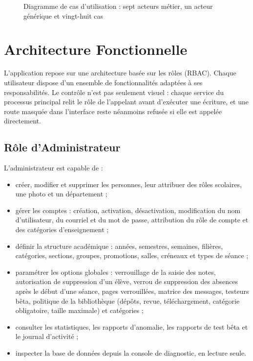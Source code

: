 \begin{figure}[H]
    \centering
    \resizebox{\textwidth}{!}{}
    \caption{Diagramme de cas d'utilisation : sept acteurs métier, un acteur générique et vingt-huit cas}
    \label{fig:usecase}
\end{figure}

\section{Architecture Fonctionnelle}
L'application repose sur une architecture basée sur les rôles (\ac{RBAC}). Chaque utilisateur dispose
d'un ensemble de fonctionnalités adaptées à ses responsabilités. Le contrôle n'est pas seulement visuel :
chaque service du processus principal relit le rôle de l'appelant avant d'exécuter une écriture, et une
route masquée dans l'interface reste néanmoins refusée si elle est appelée directement.

\subsection{Rôle d'Administrateur}
L'administrateur est capable de :
\begin{itemize}
    \item créer, modifier et supprimer les personnes, leur attribuer des rôles scolaires, une photo et
          un département ;
    \item gérer les comptes : création, activation, désactivation, modification du nom d'utilisateur, du
          courriel et du mot de passe, attribution du rôle de compte et des catégories d'enseignement ;
    \item définir la structure académique : années, semestres, semaines, filières, catégories,
          sections, groupes, promotions, salles, créneaux et types de séance ;
    \item paramétrer les options globales : verrouillage de la saisie des notes, autorisation de
          suppression d'un élève, verrou de suppression des absences après le début d'une séance,
          pages verrouillées, matrice des messages, testeurs bêta, politique de la bibliothèque
          (dépôts, revue, téléchargement, catégorie obligatoire, taille maximale) et catégories ;
    \item consulter les statistiques, les rapports d'anomalie, les rapports de test bêta et le journal
          d'activité ;
    \item inspecter la base de données depuis la console de diagnostic, en lecture seule.
\end{itemize}

